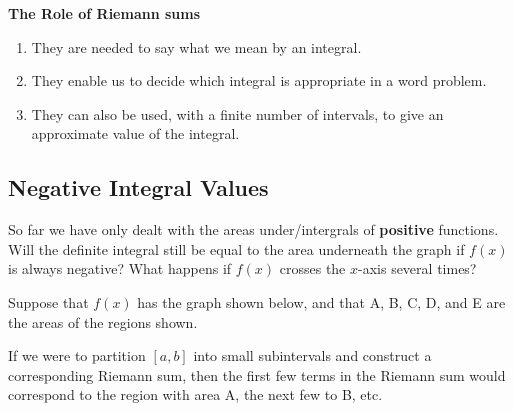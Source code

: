 




\newpage
\begin{boxnote}
{\bf The Role of Riemann sums}
\begin{enumerate}
\item They are needed to say what we mean by an integral. \\[2ex]
\item They enable us to decide which integral is appropriate in a word
problem. \\[2ex]
\item They can also be used, with a finite number of intervals, to
  give an approximate value of the integral. \\[1ex]
\end{enumerate}
\end{boxnote}

\vspace{0.5in}

\subsection*{Negative Integral Values}

So far we have only dealt with the areas under/intergrals of {\bf
  positive} functions.  Will the definite integral still be equal to
the area underneath the graph if $f(x)$ is always negative?  What
happens if $f(x)$ crosses the $x$-axis several times?



\problem Suppose that $f(x)$ has the graph shown below, and that A, B,
  C, D, and E are the areas of the regions shown.

\begin{center}
\end{center}

\newpage
\begin{center}
\end{center}

If we were to partition $[a,b]$ into small subintervals and construct a corresponding Riemann sum, then the first few terms in the Riemann sum would correspond to the region with area A, the next few to B, etc. 

